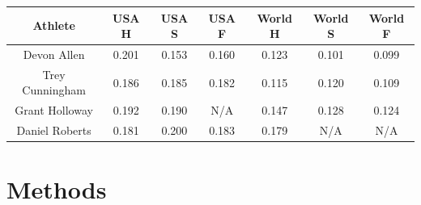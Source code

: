 \documentclass[12pt, letterpaper, titlepage]{article}
\begin{document}
\begin{center}
  \begin{tabular}{||c | c c c | c c c||} 
   \hline
   Athlete & USA H & USA S & USA F & World H & World S & World F \\ [0.5ex] 
   \hline\hline
   Devon Allen & 0.201 & 0.153 & 0.160 & 0.123 & 0.101 & 0.099 \\ 
   \hline
   Trey Cunningham & 0.186 & 0.185 & 0.182 & 0.115 & 0.120 & 0.109 \\
   \hline
   Grant Holloway & 0.192 & 0.190 & N/A & 0.147 & 0.128 & 0.124 \\
   \hline
   Daniel Roberts & 0.181 & 0.200 & 0.183 & 0.179 & N/A & N/A \\ [0.5ex]
   \hline
  \end{tabular}
  \end{center}


\section{Methods}
\label{sec:methods}
\end{document}
